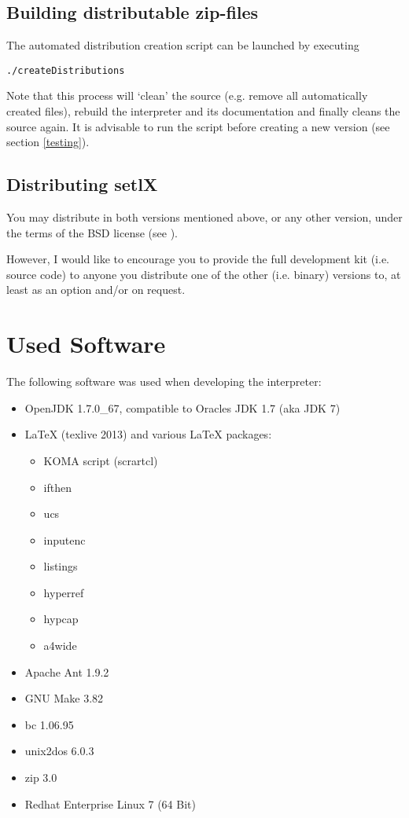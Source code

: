\subsection{Building distributable zip-files}

The automated distribution creation script can be launched by executing

\begin{lstlisting}[frame=none,numbers=none]
./createDistributions
\end{lstlisting}

Note that this process will `clean' the source (e.g. remove all automatically created files), rebuild the interpreter and its documentation and finally cleans the source again. It is advisable to run the  script before creating a new version (see section \ref{testing}).

\subsection{Distributing setlX}

You may distribute \setlX{} in both versions mentioned above, or any other version, under the terms of the BSD license (see ).

However, I would like to encourage you to provide the full development kit (i.e. source code) to anyone you distribute one of the other (i.e. binary) versions to, at least as an option and\slash{}or on request.

\section{Used Software}

The following software was used when developing the \setlX{} interpreter:

\begin{itemize}
    \item OpenJDK 1.7.0\_67, compatible to Oracles JDK 1.7 (aka JDK 7)
    \item \LaTeX{} (texlive 2013) and various \LaTeX{} packages:
        \begin{itemize}
            \item KOMA script (scrartcl)
            \item ifthen
            \item ucs
            \item inputenc
            \item listings
            \item hyperref
            \item hypcap
            \item a4wide
        \end{itemize}
    \item Apache Ant 1.9.2
    \item GNU Make 3.82
    \item bc 1.06.95
    \item unix2dos 6.0.3
    \item zip 3.0
    \item Redhat Enterprise Linux 7 (64 Bit)
\end{itemize}



